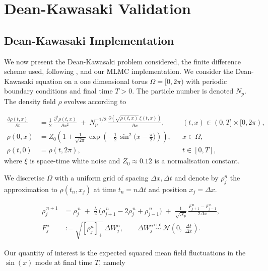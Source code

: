 \section{Dean-Kawasaki Validation}\label{sec:dk_validation}

\subsection{Dean-Kawasaki Implementation}\label{sec:dk_implementation} 
We now present the Dean-Kawasaki problem considered, the finite difference scheme
used,
following \cite{cornalba2025multilevel}, and our MLMC 
implementation.
We consider the Dean-Kawasaki equation on a one dimensional torus
$\Omega=[0,2\pi)$ with periodic boundary conditions and final time $T>0$.
The particle number is denoted $N_p$. The density 
field $\rho$ evolves according to

\begin{align}
\frac{\partial \rho(t,x)}{\partial t}
&= \frac{1}{2}\,\frac{\partial^2 \rho(t,x)}{\partial x^2}
\;+\; N_p^{-1/2}\,\frac{\partial \!\left(\sqrt{\rho(t,x)}\,\xi(t,x)\right)}{\partial x},
&& (t,x)\in (0,T]\times [0, 2\pi),
\label{eq:dk_spde_problem}\\[4pt]
\rho(0,x)
&= Z_0\!\left(1+\frac{1}{\sqrt{2\pi}}
\,\exp\!\left(-\tfrac{1}{2}\,\sin^2\!\big(x-\tfrac{\pi}{2}\big)\right)\right),
&& x\in\Omega, \nonumber\\
\rho(t,0) &= \rho(t,2\pi), &&t \in [0,T], \nonumber
\end{align}
where $\xi$ is space-time white noise and $Z_0 \approx 
0.12$ is a normalisation constant.

We discretise $\Omega$ with a uniform grid of spacing 
$\Delta x, \Delta t$ and denote by $\rho_j^n$ the approximation
to $\rho(t_n, x_j)$ at time $t_n = n \Delta t$ and position $x_j = 
\Delta x$.

\begin{align}
\rho_j^{\,n+1}
&= \rho_j^{\,n}
\;+\; \tfrac{\lambda}{2}\,\bigl(\rho_{j+1}^{\,n}-2\rho_j^{\,n}+\rho_{j-1}^{\,n}\bigr)
\;+\; \tfrac{1}{\sqrt{N_p}}\,
\frac{F_{j+1}^{\,n}-F_{j-1}^{\,n}}{2\Delta x}, \label{eq:dk_fd}\\[4pt]
F_j^n &:= \sqrt{[\rho_j^n]_+}\,\Delta W_j^n, \qquad
\Delta W_j^n \overset{\text{i.i.d.}}{\sim} \mathcal{N}\!\left(0,\ \tfrac{\Delta t}{\Delta x}\right).
\nonumber
\end{align}

Our quantity of interest is the expected squared mean field fluctuations
in the $\sin(x)$ mode at final time $T$, namely

